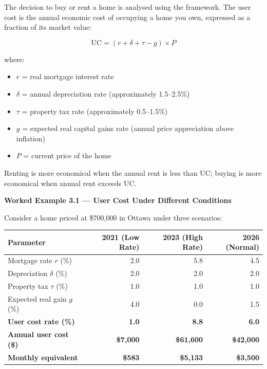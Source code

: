 The decision to buy or rent a home is analysed using the  framework. The user cost is the annual economic cost of occupying
a home you own, expressed as a fraction of its market value:

\begin{equation}
  \text{UC} = (r + \delta + \tau - g) \times P
  \label{eq:user_cost}
\end{equation}

\noindent where:
\begin{itemize}
  \item $r$ = real mortgage interest rate
  \item $\delta$ = annual depreciation rate (approximately 1.5--2.5\%)
  \item $\tau$ = property tax rate (approximately 0.5--1.5\%)
  \item $g$ = expected real capital gains rate (annual price appreciation above inflation)
  \item $P$ = current price of the home
\end{itemize}

Renting is more economical when the annual rent is less than UC;
buying is more economical when annual rent exceeds UC.

\noindent\textbf{Worked Example 3.1 --- User Cost Under Different Conditions}

\noindent Consider a home priced at \$700{,}000 in Ottawa under three scenarios:

\begin{center}
\renewcommand{\arraystretch}{1.35}
\begin{tabular}{lrrr}
\toprule
\textbf{Parameter} & \textbf{2021 (Low Rate)} & \textbf{2023 (High Rate)}
                   & \textbf{2026 (Normal)} \\
\midrule
Mortgage rate $r$ (\%)         & 2.0 & 5.8 & 4.5 \\
Depreciation $\delta$ (\%)     & 2.0 & 2.0 & 2.0 \\
Property tax $\tau$ (\%)       & 1.0 & 1.0 & 1.0 \\
Expected real gain $g$ (\%)    & 4.0 & 0.0 & 1.5 \\
\midrule
\textbf{User cost rate (\%)}   & \textbf{1.0} & \textbf{8.8} & \textbf{6.0} \\
\textbf{Annual user cost (\$)} & \textbf{\$7{,}000} & \textbf{\$61{,}600}
                                & \textbf{\$42{,}000} \\
\textbf{Monthly equivalent}    & \textbf{\$583} & \textbf{\$5{,}133}
                                & \textbf{\$3{,}500} \\
\bottomrule
\end{tabular}
\end{center}


